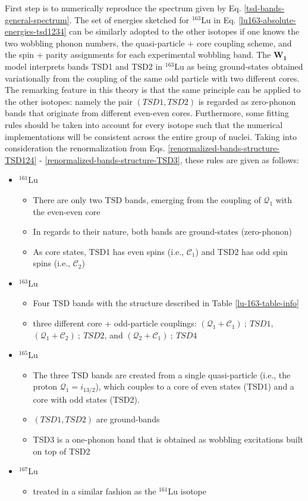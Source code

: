First step is to numerically reproduce the spectrum given by Eq. \ref{tsd-bands-general-spectrum}. The set of energies sketched for $^{163}$Lu in Eq. \ref{lu163-absolute-energies-tsd1234} can be similarly adopted to the other isotopes if one knows the two wobbling phonon numbers, the quasi-particle + core coupling scheme, and the spin + parity assignments for each experimental wobbling band. The $\mathbf{W_1}$ model interprets bands TSD1 and TSD2 in $^{163}$Lu as being ground-states obtained variationally from the coupling of the same odd particle with two different cores. The remarking feature in this theory is that the same principle can be applied to the other isotopes: namely the pair $(TSD1,TSD2)$ is regarded as zero-phonon bands that originate from different even-even cores. Furthermore, some fitting rules should be taken into account for every isotope such that the numerical implementations will be consistent across the entire group of nuclei. Taking into consideration the renormalization from Eqs. \ref{renormalized-bands-structure-TSD124} - \ref{renormalized-bands-structure-TSD3}, these rules are given as follows:
\begin{itemize}
    \item $^{161}$Lu
    \begin{itemize}
        \item There are only two TSD bands, emerging from the coupling of $\mathcal{Q}_1$ with the even-even core
        \item In regards to their nature, both bands are ground-states (zero-phonon)
        \item As core states, TSD1 has even spins (i.e., $\mathscr{C}_1$) and TSD2 has odd spin spins (i.e., $\mathscr{C}_2$)
    \end{itemize}
    \item $^{163}$Lu
    \begin{itemize}
        \item Four TSD bands with the structure described in Table \ref{lu-163-table-info}
        \item three different core + odd-particle couplings: $(\mathcal{Q}_1+\mathscr{C}_1)\ ;\ TSD1$, $(\mathcal{Q}_1+\mathscr{C}_2)\ ;\ TSD2$, and $(\mathcal{Q}_2+\mathscr{C}_1)\ ;\ TSD4$
    \end{itemize}
    \item $^{165}$Lu
    \begin{itemize}
        \item The three TSD bands are created from a single quasi-particle (i.e., the proton $\mathcal{Q}_1=i_{13/2}$), which couples to a core of even states (TSD1) and a core with odd states (TSD2).
        \item $(TSD1,TSD2)$ are ground-bands
        \item TSD3 is a one-phonon band that is obtained as wobbling excitations built on top of TSD2
    \end{itemize}
    \item $^{167}$Lu
    \begin{itemize}
        \item treated in a similar fashion as the $^{161}$Lu isotope
    \end{itemize}
\end{itemize}

